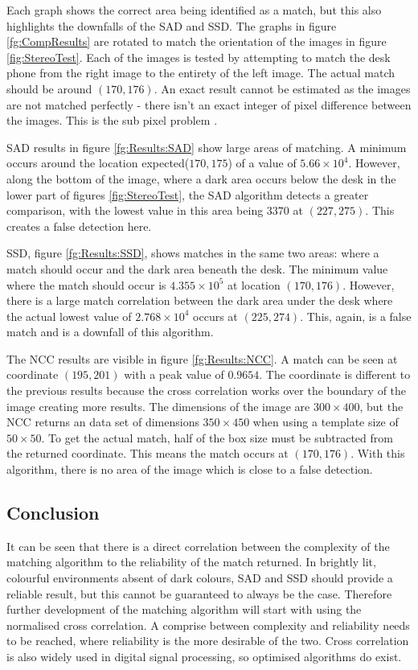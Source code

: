 Each graph shows the correct area being identified as a match, but this also highlights the downfalls of the SAD and SSD. The graphs in figure \ref{fg:CompResults} are rotated to match the orientation of the images in figure \ref{fig:StereoTest}. Each of the images is tested by attempting to match the desk phone from the right image to the entirety of the left image. The actual match should be around $(170, 176)$. An exact result cannot be estimated as the images are not matched perfectly - there isn't an exact integer of pixel difference between the images. This is the sub pixel problem \citep{haller2012design}.

SAD results in figure \ref{fg:Results:SAD} show large areas of matching. A minimum occurs around the location expected($170,175$) of a value of $5.66\times 10^4$. However, along the bottom of the image, where a dark area occurs below the desk in the lower part of figures \ref{fig:StereoTest}, the SAD algorithm detects a greater comparison, with the lowest value in this area being $3370$ at $(227, 275)$. This creates a false detection here. 

SSD, figure \ref{fg:Results:SSD}, shows matches in the same two areas: where a match should occur and the dark area beneath the desk. The minimum value where the match should occur is $4.355 \times 10^5$ at location $(170,176)$. However, there is a large match correlation between the dark area under the desk where the actual lowest value of $2.768\times10^4$ occurs at $(225,274)$. This, again, is a false match and is a downfall of this algorithm. 

The NCC results are visible in figure \ref{fg:Results:NCC}. A match can be seen at coordinate $(195,201)$ with a peak value of $0.9654$. The coordinate is different to the previous results because the cross correlation works over the boundary of the image creating more results. The dimensions of the image are $300 \times 400$, but the NCC returns an data set of dimensions $350 \times 450$ when using a template size of $50\times 50$. To get the actual match, half of the box size must be subtracted from the returned coordinate. This means the match occurs at $(170,176)$. With this algorithm, there is no area of the image which is close to a false detection. 

\subsection{Conclusion}
It can be seen that there is a direct correlation between the complexity of the matching algorithm to the reliability of the match returned. In brightly lit, colourful environments absent of dark colours, SAD and SSD should provide a reliable result, but this cannot be guaranteed to always be the case. Therefore further development of the matching algorithm will start with using the normalised cross correlation. A comprise between complexity and reliability needs to be reached, where reliability is the more desirable of the two. Cross correlation is also widely used in digital signal processing, so optimised algorithms do exist.

